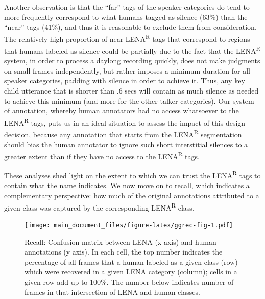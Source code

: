\documentclass[english,table,man,floatsintext]{apa6}
\begin{document}
Another observation is that the \enquote{far} tags of the speaker categories do tend to more frequently correspond to what humans tagged as silence (63\%) than the \enquote{near} tags (41\%), and thus it is reasonable to exclude them from consideration. The relatively high proportion of near LENA\textsuperscript{R} tags that correspond to regions that humans labeled as silence could be partially due to the fact that the LENA\textsuperscript{R} system, in order to process a daylong recording quickly, does not make judgments on small frames independently, but rather imposes a minimum duration for all speaker categories, padding with silence in order to achieve it. Thus, any key child utterance that is shorter than .6 secs will contain as much silence as needed to achieve this minimum (and more for the other talker categories). Our system of annotation, whereby human annotators had no access whatsoever to the LENA\textsuperscript{R} tags, puts us in an ideal situation to assess the impact of this design decision, because any annotation that starts from the LENA\textsuperscript{R} segmentation should bias the human annotator to ignore such short interstitial silences to a greater extent than if they have no access to the LENA\textsuperscript{R} tags.

These analyses shed light on the extent to which we can trust the LENA\textsuperscript{R} tags to contain what the name indicates. We now move on to recall, which indicates a complementary perspective: how much of the original annotations attributed to a given class was captured by the corresponding LENA\textsuperscript{R} class.

\begin{figure}
\centering
\texttt{[image: main\_document\_files/figure-latex/ggrec-fig-1.pdf]}
\caption{\label{fig:ggrec-fig}Recall: Confusion matrix between LENA (x axis) and human annotations (y axis). In each cell, the top number indicates the percentage of all frames that a human labeled as a given class (row) which were recovered in a given LENA category (column); cells in a given row add up to 100\%. The number below indicates number of frames in that intersection of LENA and human classes.}
\end{figure}
\end{document}
